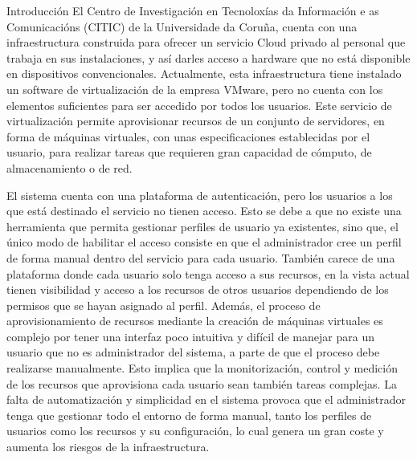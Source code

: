 \begin{chapter}{Introducción}
 El Centro de Investigación en Tecnoloxías da Información e as Comunicacións (CITIC) de la Universidade da Coruña, cuenta con una infraestructura construida para ofrecer un servicio Cloud privado al personal que trabaja en sus instalaciones, y así darles acceso a hardware que no está disponible en dispositivos convencionales. Actualmente, esta infraestructura tiene instalado un software de virtualización de la empresa VMware, pero no cuenta con los elementos suficientes para ser accedido por todos los usuarios. Este servicio de virtualización permite aprovisionar recursos de un conjunto de servidores, en forma de máquinas virtuales, con unas especificaciones establecidas por el usuario, para realizar tareas que requieren gran capacidad de cómputo, de almacenamiento o de red.

El sistema cuenta con una plataforma de autenticación, pero los usuarios a los que está destinado el servicio no tienen acceso. Esto se debe a que no existe una herramienta que permita gestionar perfiles de usuario ya existentes, sino que, el único modo de habilitar el acceso consiste en que el administrador cree un perfil de forma manual dentro del servicio para cada usuario. También carece de una plataforma donde cada usuario solo tenga acceso a sus recursos, en la vista actual tienen visibilidad y acceso a los recursos de otros usuarios dependiendo de los permisos que se hayan asignado al perfil. Además, el proceso de aprovisionamiento de recursos mediante la creación de máquinas virtuales es complejo por tener una interfaz poco intuitiva y difícil de manejar para un usuario que no es administrador del sistema, a parte de que el proceso debe realizarse manualmente. Esto implica que la monitorización, control y medición de los recursos que aprovisiona cada usuario sean también tareas complejas. La falta de automatización y simplicidad en el sistema provoca que el administrador tenga que gestionar todo el entorno de forma manual, tanto los perfiles de usuarios como los recursos y su configuración, lo cual genera un gran coste y aumenta los riesgos de la infraestructura.


\end{chapter}
